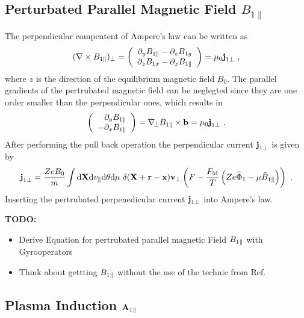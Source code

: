 \newpage

\subsection{Perturbated Parallel Magnetic Field $B_{1\parallel}$}
\label{sub:fieldMagnetic}

The perpendicular compentent of Ampere's law can be written as 
\begin{gather}
	(\nabla \times B_{1\parallel})_\perp = \left( \begin{array}{c} \partial_y B_{1 \parallel} - \partial_z B_{1 y} \\ \partial_z B_{1x} - \partial_x B_{1 \parallel} \end{array} \right) = \mu_0 \boldsymbol{\mathbf{j}}_{1 \perp}~,
	\label{eq:perpendicularAmpereLaw}
\end{gather}
where $z$ is the direction of the equilibrium magnetic field $B_0$. The parallel gradients of the pertrubated magnetic field can be neglegted since they are one order smaller than the perpendicular ones, which results in
\begin{gather}
	\left( \begin{array}{r} \partial_y B_{1 \parallel} \\ - \partial_x B_{1 \parallel} \end{array} \right) = \nabla_{\!\perp} B_{1\parallel} \times \boldsymbol{\mathbf{b}} = \mu_0 \boldsymbol{\mathbf{j}}_{1 \perp}~.
\end{gather}
After performing the pull back operation the perpendicular current $\boldsymbol{\mathbf{j}}_{1\perp}$ is given by 
\begin{gather}
		\boldsymbol{\mathbf{j}}_{1\perp} = \frac{Ze B_0}{m} \int \mathrm{d}\boldsymbol{\mathbf{X}}\mathrm{d}v_\parallel\mathrm{d}\theta\mathrm{d}\mu ~ \delta(\boldsymbol{\mathbf{X}} + \boldsymbol{\mathbf{r}} - \boldsymbol{\mathbf{x}}) \boldsymbol{\mathbf{v}}_\perp \left(F - \frac{F_\mathrm{M}}{T}\left(Ze \widetilde{\Phi}_1 - \mu \bar{B}_{1\parallel}\right) \right) ~.
	\label{eq:perpendicularCurrentPullback}
\end{gather}
Inserting the pertrubated perpenedicular current $\boldsymbol{\mathbf{j}}_{1 \perp}$ into Ampere's law.

\textbf{TODO:}
\begin{itemize}
	\item Derive Equation for pertrubated parallel magnetic Field $B_{1\parallel}$ with Gyrooperators
	\item Think about gettting $B_{1\parallel}$ without the use of the technic from Ref. 
\end{itemize}

\newpage

\subsection{Plasma Induction $\boldsymbol{\mathbf{A}}_{1\parallel}$}
\label{sub:fieldInduction}

